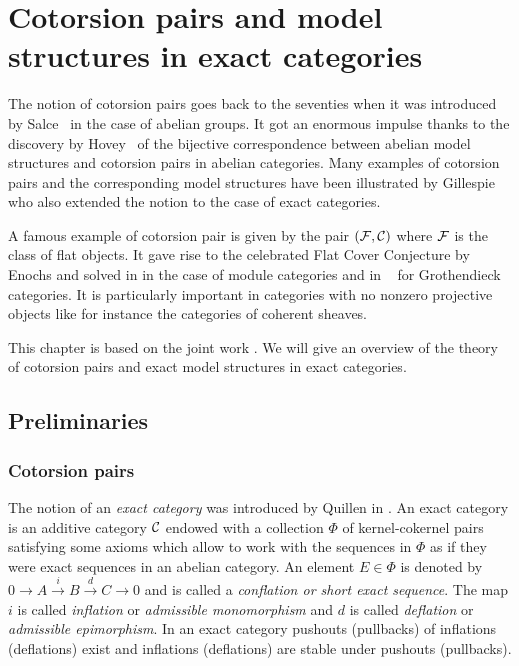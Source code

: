 \chapter{Cotorsion pairs and model structures in exact categories}\label{ch:acycexact} %
The notion of cotorsion pairs goes back to the seventies when it was introduced by Salce~\cite{Sal} in the case of abelian groups.
It got an enormous impulse thanks to the discovery by Hovey~\cite{Hov07} of the bijective correspondence between abelian model structures and cotorsion pairs in abelian categories. Many examples of cotorsion pairs and the corresponding model structures have been illustrated by Gillespie \cite{G5} who also extended the notion to the case of exact categories.

A famous example of cotorsion pair is given by the pair $(\mathcal{F}, \mathcal{C})$ where $\mathcal{F}$ is the class of flat objects. It gave rise to the celebrated Flat Cover Conjecture by Enochs and solved in \cite{BEE} in the case of module categories and in ~\cite{ElB} for Grothendieck categories. It is particularly important in categories with no nonzero projective objects like for instance the categories of coherent sheaves.

This chapter is based on the joint work \cite{bazzoni2018recollements}. We will give an overview of the theory of cotorsion pairs and exact model structures in exact categories.

\section{Preliminaries}\label{sec:preliminaries}

\subsection{Cotorsion pairs}\label{S:cot-pair}

The notion of an \emph{exact category} was introduced by Quillen in \cite{Q}.
An exact category is an additive category  $\mathcal{C}$ endowed with  a collection $\Phi$ of kernel-cokernel pairs  satisfying some axioms which allow to work with the sequences  in $\Phi$ as if they were exact sequences in an abelian category. An element $E\in \Phi$ is denoted by $0\to A\overset{i}\to B\overset{d}\to C\to 0$ and is called a \emph{conflation or short exact sequence}. The map $i$ is called \emph{inflation} or \emph{admissible monomorphism} and $d$ is called \emph{deflation} or \emph{admissible epimorphism}.
In an exact category pushouts (pullbacks) of inflations (deflations) exist and inflations (deflations) are stable under pushouts (pullbacks).

